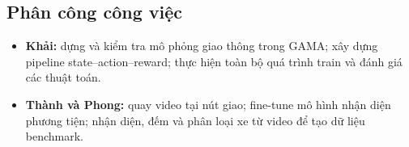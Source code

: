 \documentclass[11pt,a4paper,headings=small,parskip=half]{scrartcl}
\begin{document}
\subsection{Phân công công việc}
\begin{itemize}[leftmargin=1.5em,itemsep=2pt,topsep=3pt]
 \item \textbf{Khải:} dựng và kiểm tra mô phỏng giao thông trong GAMA; xây dựng pipeline state--action--reward; thực hiện toàn bộ quá trình train và đánh giá các thuật toán.
 \item \textbf{Thành và Phong:} quay video tại nút giao; fine-tune mô hình nhận diện phương tiện; nhận diện, đếm và phân loại xe từ video để tạo dữ liệu benchmark.
\end{itemize}
\end{document}

